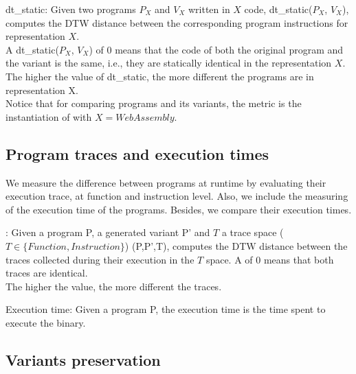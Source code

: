 \begin{metric}{dt\_static:}\label{metric:static1}
	Given two programs $P_X$ and $V_X$ written in $X$ code, dt\_static($P_X$, $V_X$), computes the DTW distance between the corresponding program instructions for representation $X$. \\
	
	A dt\_static($P_X$, $V_X$) of $0$ means that the code of both the original program and the variant  is the same, i.e., they are statically identical in the representation $X$. The higher the value of dt\_static, the more different the programs are in representation X. \\

	Notice that for comparing \wasm programs and its variants, the metric is the instantiation of \DTWStatic with $X=WebAssembly$.
\end{metric}

\subsection{Program traces and execution times}

We measure the difference between programs at runtime by evaluating their execution trace, at function and instruction level. Also, we include the measuring of the execution time of the programs. Besides, we compare their execution times.


\begin{metric}{\DTW{}:}\label{metric:stack}
	Given a program P, a \tool generated variant P' and $T$ a trace space ($T \in \{Function, Instruction \}$) \DTW{}(P,P',T), computes the DTW distance between the traces collected during their execution in the $T$ space. A \DTW{} of $0$ means that both traces are identical. \\ 
	
	The higher the value, the more different the traces. 
\end{metric}


\begin{metric}{Execution time:}\label{metric:time}
	Given a \wasm program P, the execution time is the time spent to execute the binary.
\end{metric}

\subsection{Variants preservation}


